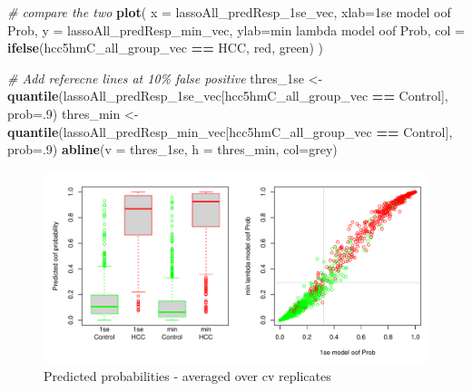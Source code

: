 \documentclass[
]{book}
\newenvironment{Shaded}{\begin{snugshade}}{\end{snugshade}}
\newcommand{\CommentTok}[1]{\textcolor[rgb]{0.56,0.35,0.01}{\textit{#1}}}
\newcommand{\DataTypeTok}[1]{\textcolor[rgb]{0.13,0.29,0.53}{#1}}
\newcommand{\DecValTok}[1]{\textcolor[rgb]{0.00,0.00,0.81}{#1}}
\newcommand{\KeywordTok}[1]{\textcolor[rgb]{0.13,0.29,0.53}{\textbf{#1}}}
\newcommand{\NormalTok}[1]{#1}
\newcommand{\OperatorTok}[1]{\textcolor[rgb]{0.81,0.36,0.00}{\textbf{#1}}}
\newcommand{\StringTok}[1]{\textcolor[rgb]{0.31,0.60,0.02}{#1}}
\begin{document}
\begin{Shaded}
\begin{Highlighting}[]
\CommentTok{\# compare the two}
\KeywordTok{plot}\NormalTok{(}
 \DataTypeTok{x =}\NormalTok{ lassoAll\_predResp\_1se\_vec, }\DataTypeTok{xlab=}\StringTok{\textquotesingle{}1se model oof Prob\textquotesingle{}}\NormalTok{,}
 \DataTypeTok{y =}\NormalTok{ lassoAll\_predResp\_min\_vec, }\DataTypeTok{ylab=}\StringTok{\textquotesingle{}min lambda model oof Prob\textquotesingle{}}\NormalTok{,}
 \DataTypeTok{col =} \KeywordTok{ifelse}\NormalTok{(hcc5hmC\_all\_group\_vec }\OperatorTok{==}\StringTok{ \textquotesingle{}HCC\textquotesingle{}}\NormalTok{, }\StringTok{\textquotesingle{}red\textquotesingle{}}\NormalTok{, }\StringTok{\textquotesingle{}green\textquotesingle{}}\NormalTok{)}
\NormalTok{)}
 
\CommentTok{\# Add referecne lines at 10\% false positive}
\NormalTok{thres\_1se <{-}}\StringTok{ }\KeywordTok{quantile}\NormalTok{(lassoAll\_predResp\_1se\_vec[hcc5hmC\_all\_group\_vec }\OperatorTok{==}\StringTok{ \textquotesingle{}Control\textquotesingle{}}\NormalTok{], }\DataTypeTok{prob=}\NormalTok{.}\DecValTok{9}\NormalTok{)}
\NormalTok{thres\_min <{-}}\StringTok{ }\KeywordTok{quantile}\NormalTok{(lassoAll\_predResp\_min\_vec[hcc5hmC\_all\_group\_vec }\OperatorTok{==}\StringTok{ \textquotesingle{}Control\textquotesingle{}}\NormalTok{], }\DataTypeTok{prob=}\NormalTok{.}\DecValTok{9}\NormalTok{)}
\KeywordTok{abline}\NormalTok{(}\DataTypeTok{v =}\NormalTok{ thres\_1se, }\DataTypeTok{h =}\NormalTok{ thres\_min, }\DataTypeTok{col=}\StringTok{\textquotesingle{}grey\textquotesingle{}}\NormalTok{)}
\end{Highlighting}
\end{Shaded}

\begin{figure}
\centering
\includegraphics{Static/figures/hcc5hmC-glmnetSuite-get-sample-pred-1.pdf}
\caption{\label{fig:hcc5hmC-glmnetSuite-get-sample-pred}Predicted probabilities - averaged over cv replicates}
\end{figure}
\end{document}
